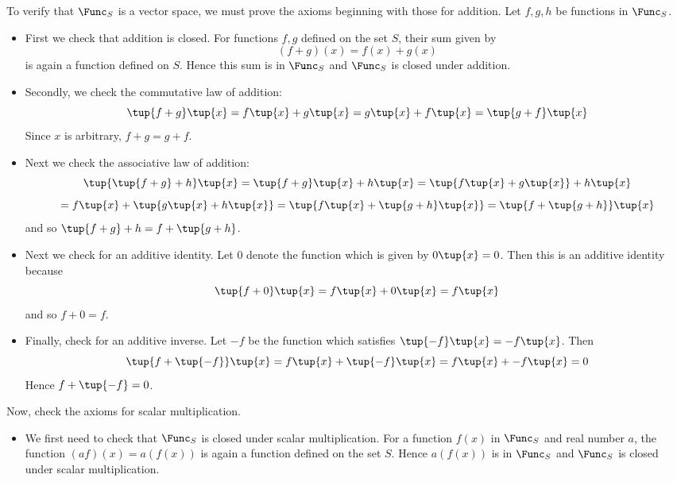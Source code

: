 \begin{solution}
To verify that $\Func_S$ is a vector space, we must prove the axioms beginning with those for addition. Let $f, g, h$ be functions in $\Func_S$. 

\begin{itemize}
\item
First we check that addition is closed.  For functions $f, g$ defined on the set $S$, their sum given by 
\[
(f+g)(x) = f(x)+g(x)
\]
is again a function defined on $S$. Hence this sum is in $\Func_S$ and $\Func_S$ is closed under addition. 

\item
Secondly, we check the commutative law of addition:
\begin{equation*}
\tup{f+g} \tup{x} =f\tup{x} +g\tup{x}
=g\tup{x} +f\tup{x} =\tup{g+f} \tup{x}
\end{equation*}
Since $x$ is arbitrary, $f+g=g+f$.

\item
Next we check the associative law of addition:
\begin{equation*}
\tup{\tup{f+g} +h} \tup{x} = \tup{f+g}
\tup{x} +h\tup{x} =\tup{f\tup{x} +g\tup{x}
} +h\tup{x}
\end{equation*}
\begin{equation*}
=f\tup{x} +\tup{g\tup{x} +h\tup{x} } =\tup{
f\tup{x} +\tup{g+h} \tup{x} } =\tup{f+\tup{
g+h} } \tup{x}
\end{equation*}
and so $\tup{f+g} +h=f+\tup{g+h}$.

\item
Next we check for an additive identity.  Let $0$ denote the
function which is given by $0\tup{x} =0$. Then this is an additive
identity because 
\begin{equation*}
\tup{f+0} \tup{x} =f\tup{x} +0\tup{x}
=f\tup{x}
\end{equation*}
and so $f+0=f$. 

\item
Finally, check for an additive inverse. Let $-f$ be the function which satisfies $\tup{-f}
\tup{x} = -f\tup{x}$. Then 
\begin{equation*}
\tup{f+\tup{-f} } \tup{x} = f\tup{x}
+\tup{-f} \tup{x} = f\tup{x} +-f\tup{x}
=0
\end{equation*}
Hence $f+\tup{-f} =0$. 
\end{itemize}

Now, check the axioms for scalar multiplication.
\begin{itemize}
\item
We first need to check that $\Func_S$ is closed under scalar multiplication. 
For a function $f(x)$ in $\Func_S$ and real number $a$, the function $(af)(x) = a(f(x))$ is again a function defined on the set $S$. Hence $a(f(x))$ is in $\Func_S$ and $\Func_S$ is closed under scalar multiplication. 


\end{itemize}
\end{solution}
